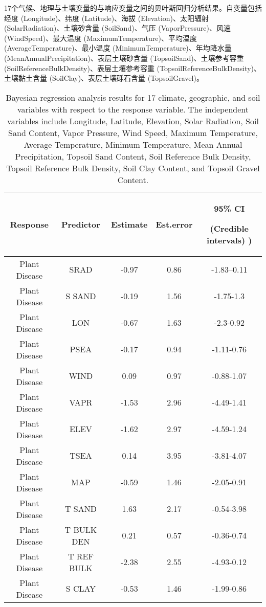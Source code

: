 \documentclass[AutoFakeBold]{LZUThesis-PgD&PhD}
\begin{document}
	
	\begin{table}[H]
		\centering
		\caption{17个气候、地理与土壤变量的与响应变量之间的贝叶斯回归分析结果。自变量包括经度 (Longitude)、纬度 (Latitude)、海拔 (Elevation)、太阳辐射 (SolarRadiation)、土壤砂含量 (SoilSand)、气压 (VaporPressure)、风速 (WindSpeed)、最大温度 (MaximumTemperature)、平均温度 (AverageTemperature)、最小温度 (MinimumTemperature)、年均降水量 (MeanAnnualPrecipitation)、表层土壤砂含量 (TopsoilSand)、土壤参考容重 (SoilReferenceBulkDensity)、表层土壤参考容重 (TopsoilReferenceBulkDensity)、土壤黏土含量 (SoilClay)、表层土壤砾石含量 (TopsoilGravel)。}
		\caption*{Bayesian regression analysis results for 17 climate, geographic, and soil variables with respect to the response variable. The independent variables include Longitude, Latitude, Elevation, Solar Radiation, Soil Sand Content, Vapor Pressure, Wind Speed, Maximum Temperature, Average Temperature, Minimum Temperature, Mean Annual Precipitation, Topsoil Sand Content, Soil Reference Bulk Density, Topsoil Reference Bulk Density, Soil Clay Content, and Topsoil Gravel Content.}
		\begin{tabular}{ccccc}
			\hline
			Response & Predictor & Estimate & Est.error & 95\% CI \par (Credible intervals) ) \\ 
			\hline
			Plant Disease & SRAD & -0.97 & 0.86 & -1.83--0.11 \\ 
			Plant Disease & S SAND & -0.19 & 1.56 & -1.75-1.3 \\ 
			Plant Disease & LON & -0.67 & 1.63 & -2.3-0.92 \\ 
			Plant Disease & PSEA & -0.17 & 0.94 & -1.11-0.76 \\ 
			Plant Disease & WIND & 0.09 & 0.97 & -0.88-1.07 \\ 
			Plant Disease & VAPR & -1.53 & 2.96 & -4.49-1.41 \\ 
			Plant Disease & ELEV & -1.62 & 2.97 & -4.59-1.24 \\ 
			Plant Disease & TSEA & 0.14 & 3.95 & -3.81-4.07 \\ 
			Plant Disease & MAP & -0.59 & 1.46 & -2.05-0.91 \\ 
			Plant Disease & T SAND & 1.63 & 2.17 & -0.54-3.98 \\ 
			Plant Disease & T BULK DEN & 0.21 & 0.57 & -0.36-0.74 \\ 
			Plant Disease & T REF BULK & -2.38 & 2.55 & -4.93-0.12 \\ 
			Plant Disease & S CLAY & -0.53 & 1.46 & -1.99-0.86 \\ 
			\hline
		\end{tabular}
		
	\end{table}
	
\end{document}
